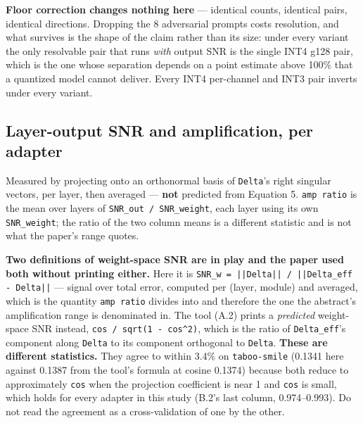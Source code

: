 \textbf{Floor correction changes nothing here} --- identical counts, identical pairs, identical directions. Dropping the 8 adversarial prompts costs resolution, and what survives is the shape of the claim rather than its size: under every variant the only resolvable pair that runs \emph{with} output SNR is the single INT4 g128 pair, which is the one whose separation depends on a point estimate above 100\% that a quantized model cannot deliver. Every INT4 per-channel and INT3 pair inverts under every variant.

\subsection{Layer-output SNR and amplification, per adapter}

Measured by projecting onto an orthonormal basis of \texttt{Delta}'s right singular vectors, per layer, then averaged --- \textbf{not} predicted from Equation 5. \texttt{amp ratio} is the mean over layers of \texttt{SNR\_\allowbreak{}out / SNR\_\allowbreak{}weight}, each layer using its own \texttt{SNR\_\allowbreak{}weight}; the ratio of the two column means is a different statistic and is not what the paper's range quotes.

\textbf{Two definitions of weight-space SNR are in play and the paper used both without printing either.} Here it is \texttt{SNR\_\allowbreak{}w = ||Delta|| / ||Delta\_\allowbreak{}eff - Delta||} --- signal over total error, computed per (layer, module) and averaged, which is the quantity \texttt{amp ratio} divides into and therefore the one the abstract's amplification range is denominated in. The tool (A.2) prints a \emph{predicted} weight-space SNR instead, \texttt{cos / sqrt(1 - cos\textasciicircum{}2)}, which is the ratio of \texttt{Delta\_\allowbreak{}eff}'s component along \texttt{Delta} to its component orthogonal to \texttt{Delta}. \textbf{These are different statistics.} They agree to within 3.4\% on \texttt{taboo-\allowbreak{}smile} (0.1341 here against 0.1387 from the tool's formula at cosine 0.1374) because both reduce to approximately \texttt{cos} when the projection coefficient is near 1 and \texttt{cos} is small, which holds for every adapter in this study (B.2's last column, 0.974--0.993). Do not read the agreement as a cross-validation of one by the other.

